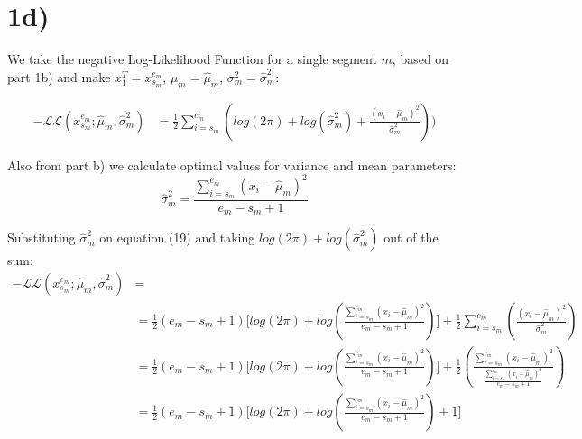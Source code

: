 \section*{1d)} %
\label{sec:1d}

We take the negative Log-Likelihood Function for a single segment $m$, based on part 1b) and make $x_1^T=x_{s_m}^{e_m}$, $ \mu_m=\hat{\mu}_m$, $\sigma_m^2=\hat{\sigma}_m^2$:

\begin{align}
-\mathcal{L}\mathcal{L}(x_{s_m}^{e_m}; \hat{\mu}_m, \hat{\sigma}_m^2) &= \frac{1}{2}\sum_{i=s_m}^{e_m}(log(2\pi)+log(\hat{\sigma}_m^2)+\frac{(x_i - \hat{\mu}_m)^2}{\hat{\sigma}_m^2}))
\end{align}

Also from part b) we calculate optimal values for variance and mean parameters:
\[
\hat{\sigma}_m^2 = \frac{\sum_{i=s_m}^{e_m}(x_i - \hat{\mu}_m)^2}{e_m - s_m + 1}
\]

Substituting $\hat{\sigma}_m^2$ on equation (19) and taking $log(2\pi)+log(\hat{\sigma}_m^2)$ out of the sum:
\begin{align*}
-\mathcal{L}\mathcal{L}(x_{s_m}^{e_m}; \hat{\mu}_m, \hat{\sigma}_m^2) &= \\
&= \frac{1}{2}(e_m - s_m + 1)\Bigg[log(2\pi)+log(\frac{\sum_{i=s_m}^{e_m}(x_i - \hat{\mu}_m)^2}{e_m - s_m + 1})\Bigg] + \frac{1}{2}\sum_{i=s_m}^{e_m}(\frac{(x_i - \hat{\mu}_m)^2}{\hat{\sigma}_m^2})\\
&= \frac{1}{2}(e_m - s_m + 1)\Bigg[log(2\pi)+log(\frac{\sum_{i=s_m}^{e_m}(x_i - \hat{\mu}_m)^2}{e_m - s_m + 1})\Bigg] + \frac{1}{2}(\frac{\sum_{i=s_m}^{e_m}(x_i - \hat{\mu}_m)^2}{\frac{\sum_{i=s_m}^{e_m}(x_i - \hat{\mu}_m)^2}{e_m - s_m + 1}}) \\
&= \frac{1}{2}(e_m - s_m + 1)\Bigg[log(2\pi)+log(\frac{\sum_{i=s_m}^{e_m}(x_i - \hat{\mu}_m)^2}{e_m - s_m + 1}) + 1\Bigg]
\end{align*}


